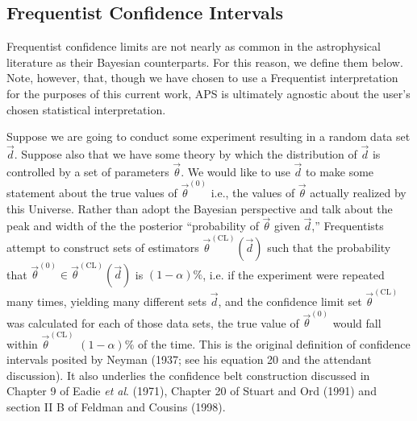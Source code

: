 \documentclass[useAMS,usenatbib]{aastex}
\newcommand{\APS}{APS }
\begin{document}
\begin{appendix}
\section{Frequentist Confidence Intervals}
\label{sec:frequentism}

Frequentist confidence limits are not nearly as common in the astrophysical
literature as their Bayesian counterparts.  For this reason, we define them below.
Note, however, that, though we have chosen to use a Frequentist
interpretation for the purposes of this current work, \APS is ultimately agnostic
about the user's chosen statistical interpretation. 

Suppose we are going to conduct some experiment resulting in a random data set
$\vec{d}$.  Suppose also that we have some theory by which the distribution of
$\vec{d}$ is controlled by a set of parameters $\vec{\theta}$.  We would like to
use $\vec{d}$ to make some statement about the true values of $\vec{\theta}^{(0)}$
i.e., the values of $\vec{\theta}$ actually realized by this Universe.
Rather than adopt the Bayesian perspective 
and talk about the peak and width of the
the posterior
``probability of $\vec{\theta}$ given $\vec{d}$,'' Frequentists attempt to
construct sets of estimators
$\vec{\theta}^{(\text{CL})}(\vec{d})$ such that the
probability that 
$\vec{\theta}^{(0)}\in\vec{\theta}^{(\text{CL})}(\vec{d})$
is $(1-\alpha)\%$, i.e. if the experiment were repeated many times, yielding
many different sets $\vec{d}$, and the confidence limit set
$\vec{\theta}^{(\text{CL})}$
was calculated for each of those data sets, the true
value of $\vec{\theta}^{(0)}$ would fall within $\vec{\theta}^{(\text{CL})}$ 
$(1-\alpha)\%$ of the time.
This is the original definition of confidence intervals posited by Neyman (1937;
see his equation 20 and the attendant discussion).  It also underlies the
confidence belt construction discussed 
in Chapter 9 of Eadie {\it et al}. (1971), Chapter 20 of Stuart and Ord (1991)
and section II B of Feldman and Cousins (1998).


\end{appendix}
\end{document}
